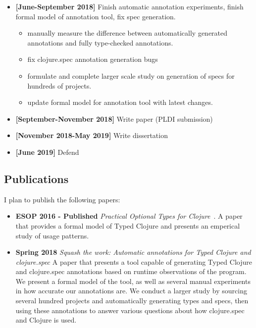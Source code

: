 \documentclass[9pt]{extarticle}
\begin{document}
\begin{itemize}
  \item \textbf{[June-September 2018]} Finish automatic annotation experiments, finish formal model of annotation tool, fix spec generation.
		\begin{itemize}
			\item manually measure the difference between automatically generated annotations and
				fully type-checked annotations.
      \item fix clojure.spec annotation generation bugs
			\item formulate and complete larger scale study on generation of specs for hundreds of projects.
			\item update formal model for annotation tool with latest changes.
		\end{itemize}
  \item \textbf{[September-November 2018]} Write paper (PLDI submission)
  \item \textbf{[November 2018-May 2019]} Write dissertation
  \item \textbf{[June 2019]} Defend
\end{itemize}

\subsection{Publications}

I plan to publish the following papers:

\begin{itemize}
  \item \textbf{ESOP 2016 - Published} \emph{Practical Optional Types for Clojure}~\cite{bonnaire2016practical}.
    A paper that provides a formal model of Typed Clojure and presents an emperical
    study of usage patterns.
  \item \textbf{Spring 2018} \emph{Squash the work: Automatic annotations for Typed Clojure and clojure.spec}
		A paper that presents a tool capable of generating Typed Clojure and clojure.spec
		annotations based on runtime observations of the program.
		We present a formal model of the tool, as well as several manual experiments in how
		accurate our annotations are.
    We conduct a larger study by sourcing several hundred projects and automatically
    generating types and specs, then using these annotations to answer various questions
    about how clojure.spec and Clojure is used.
\end{itemize}


\printbibliography
\end{document}
